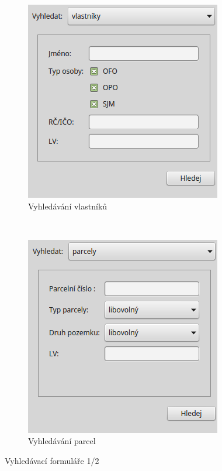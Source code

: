 \documentclass[a4paper,12pt,oneside]{book}
\begin{document}
\begin{figure}[htb]
    \centering
    \begin{subfigure}[b]{0.4\textwidth}
        \centering
        \includegraphics[width=\textwidth]{images/vfkPlugin-vlastnici.png}
        \caption{Vyhledávání vlastníků}
    \end{subfigure}
    ~
    \begin{subfigure}[b]{0.4\textwidth}
        \centering
        \includegraphics[width=\textwidth]{images/vfkPlugin-parcely.png}
        \caption{Vyhledávání parcel}
    \end{subfigure}
    \caption{Vyhledávací formuláře 1/2}
    \label{l_vyhledavani_1}
\end{figure}
\end{document}
